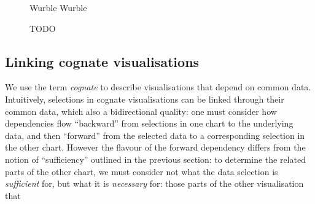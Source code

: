 \begin{figure}[H]
   \small
   \subcaptionbox
      {Wurble}
      {}
   \subcaptionbox
      {Wurble}
      {}
   \caption{TODO}
\end{figure}

\subsection{Linking cognate visualisations}

We use the term \emph{cognate} to describe visualisations that depend on common data. Intuitively, selections in cognate visualisations can be linked through their common data, which also a bidirectional quality: one must consider how dependencies flow ``backward'' from selections in one chart to the underlying data, and then ``forward'' from the selected data to a corresponding selection in the other chart. However the flavour of the forward dependency differs from the notion of ``sufficiency'' outlined in the previous section: to determine the related parts of the other chart, we must consider not what the data selection is \emph{sufficient} for, but what it is \emph{necessary} for: those parts of the other visualisation that




